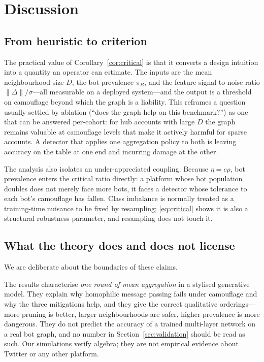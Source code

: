 \documentclass[../elsevier.tex]{subfiles}
\begin{document}
\section{Discussion}
\label{sec:discussion}

\subsection{From heuristic to criterion}

The practical value of Corollary~\ref{cor:critical} is that it converts a design
intuition into a quantity an operator can estimate. The inputs are the mean
neighbourhood size $D$, the bot prevalence $\pi_B$, and the feature signal-to-noise
ratio $\|\Delta\|/\sigma$---all measurable on a deployed system---and the output is
a threshold on camouflage beyond which the graph is a liability. This reframes a
question usually settled by ablation (``does the graph help on this benchmark?'')
as one that can be answered per-cohort: for hub accounts with large $D$ the graph
remains valuable at camouflage levels that make it actively harmful for sparse
accounts. A detector that applies one aggregation policy to both is leaving
accuracy on the table at one end and incurring damage at the other.

The analysis also isolates an under-appreciated coupling. Because
$\eta = c\rho$, bot prevalence enters the critical ratio directly: a platform whose
bot population doubles does not merely face more bots, it faces a detector whose
tolerance to each bot's camouflage has fallen. Class imbalance is normally treated
as a training-time nuisance to be fixed by resampling; \eqref{eq:critical} shows it
is also a structural robustness parameter, and resampling does not touch it.

\subsection{What the theory does and does not license}

We are deliberate about the boundaries of these claims.

The results characterise \emph{one round of mean aggregation} in a stylised
generative model. They explain why homophilic message passing fails under
camouflage and why the three mitigations help, and they give the correct
qualitative orderings---more pruning is better, larger neighbourhoods are safer,
higher prevalence is more dangerous. They do not predict the accuracy of a trained
multi-layer network on a real bot graph, and no number in
Section~\ref{sec:validation} should be read as such. Our simulations verify
algebra; they are not empirical evidence about Twitter or any other platform.
\end{document}
